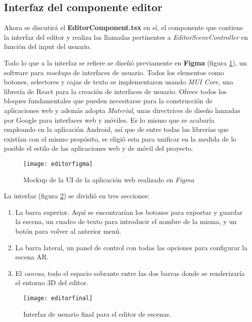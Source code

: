 \subsection{Interfaz del componente editor}

Ahora se discutirá el \textbf{EditorComponent.tsx} en sí, el componente que contiene la interfaz del editor y realiza las llamadas pertinentes a \textit{EditorSceneController} en función del input del usuario.

Todo lo que a la interfaz se refiere se diseñó previamente en \textbf{Figma}\cite{figma} (figura \ref{fig:editorfigma}), un software para \textit{mockups} de interfaces de usuario. Todos los elementos como botones, selectores y cajas de texto se implementaron usando \textit{MUI Core}, una librería de React para la creación de interfaces de usuario. Ofrece todos los bloques fundamentales que pueden necesitarse para la construcción de aplicaciones web y además adopta \textit{Material}, unas directrices de diseño lanzadas por Google para interfaces web y móviles. Es lo mismo que se acabaría empleando en la aplicación Android, así que de entre todas las librerías que existían con el mismo propósito, se eligió esta para unificar en la medida de lo posible el estilo de las aplicaciones web y de móvil del proyecto.

\begin{figure}[h]
    \centering
    \texttt{[image: editorfigma]}
    \caption[Mockup de la UI de la aplicación web]{Mockup de la UI de la aplicación web realizado en \textit{Figma}}
    \label{fig:editorfigma}
\end{figure}

La interfaz (figura \ref{fig:editorfinal}) se dividió en tres secciones:

\begin{enumerate}
    \item La barra superior. Aquí se encontrarían los botones para exportar y guardar la escena, un cuadro de texto para introducir el nombre de la misma, y un botón para volver al anterior menú.
    \item La barra lateral, un panel de control con todas las opciones para configurar la escena AR.
    \item El \textit{canvas}, todo el espacio sobrante entre las dos barras donde se renderizaría el entorno 3D del editor.
\end{enumerate}

\begin{figure}[h]
    \centering
    \texttt{[image: editorfinal]}
    \caption[Interfaz de usuario para el editor de escenas]{Interfaz de usuario final para el editor de escenas.}
    \label{fig:editorfinal}
\end{figure}

